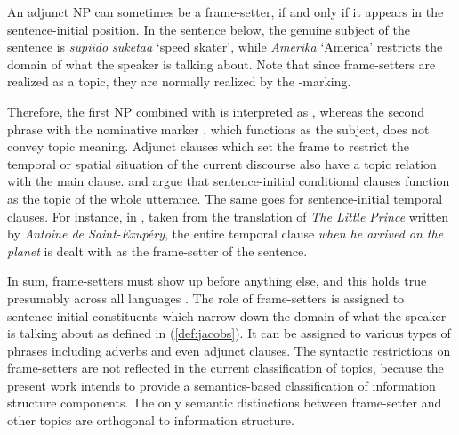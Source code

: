\noindent An adjunct NP can sometimes be a frame-setter, if and only
if it appears in the sentence-initial position. In the 
sentence  below, the genuine subject of
the sentence is \textit{supiido suketaa} `speed skater', while
\textit{Amerika} `America' restricts the domain of what the speaker is
talking about. Note that since frame-setters are realized as a topic,
they are normally realized by the
\wa-marking.



\noindent Therefore, the first NP combined with \wa is interpreted as
, whereas the second phrase with the nominative marker \ga, which
functions as the subject, does not convey topic meaning.  Adjunct
clauses which set the frame to restrict the temporal or spatial
situation of the current discourse also have a topic relation with the
main clause.  \citet{haiman:78} and \citet{ramsay:87} argue that
sentence-initial conditional clauses function as the topic of the
whole utterance.  The same goes for sentence-initial temporal
clauses. For instance, in , taken from
the translation of \textit{The
  Little Prince} written by \textit{Antoine de Saint-Exup{\'e}ry}, the
entire temporal clause \textit{when he arrived on the planet} is dealt
with as the frame-setter of the sentence.




In sum, frame-setters must show up before anything else, and this
holds true presumably across all languages
\citep{chafe:76,lambrecht:96}. The role of frame-setters is assigned
to sentence-initial constituents which narrow down the domain of what
the speaker is talking about as defined in (\ref{def:jacobs}).  It can
be assigned to various types of phrases including adverbs and even
adjunct clauses.  The syntactic restrictions on frame-setters are not
reflected in the current classification of topics, because the present
work intends to provide a semantics-based classification of
information structure components.  The only semantic distinctions
between frame-setter and other topics are orthogonal to information
structure.



